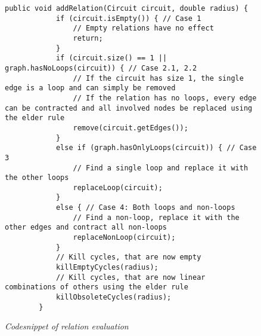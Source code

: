 \lstset{language=Java}
\begin{figure}
    \begin{lstlisting}[frame=single]
        public void addRelation(Circuit circuit, double radius) {
            if (circuit.isEmpty()) { // Case 1
                // Empty relations have no effect
                return;
            }
            if (circuit.size() == 1 || graph.hasNoLoops(circuit)) { // Case 2.1, 2.2
                // If the circuit has size 1, the single edge is a loop and can simply be removed
                // If the relation has no loops, every edge can be contracted and all involved nodes be replaced using the elder rule
                remove(circuit.getEdges());
            }
            else if (graph.hasOnlyLoops(circuit)) { // Case 3
                // Find a single loop and replace it with the other loops
                replaceLoop(circuit);
            }
            else { // Case 4: Both loops and non-loops
                // Find a non-loop, replace it with the other edges and contract all non-loops
                replaceNonLoop(circuit);
            }
            // Kill cycles, that are now empty
            killEmptyCycles(radius);
            // Kill cycles, that are now linear combinations of others using the elder rule
            killObsoleteCycles(radius);
        }
    \end{lstlisting}
    \caption{\textit{Codesnippet of relation evaluation}}
    \label{fig6}
\end{figure}